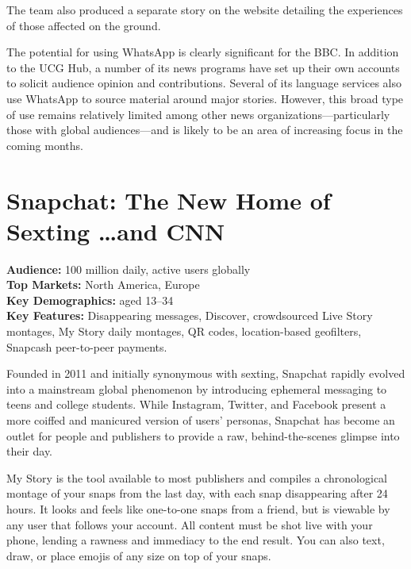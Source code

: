 \documentclass[notoc, symmetric, nobib, nols]{towcenter-guideto-book}
\begin{document}
The team also produced a separate story on the website detailing the experiences of those affected on the ground.\autocite{BBCNepal}


The potential for using WhatsApp is clearly significant for the BBC. In addition to the UCG Hub, a number of its news programs have set up their own accounts to solicit audience opinion and contributions. Several of its language services also use WhatsApp to source material around major stories. However, this broad type of use remains relatively limited among other news organizations---particularly those with global audiences---and is likely to be an area of increasing focus in the coming months.

\newpage
\section{Snapchat: The New Home of Sexting \ldots \protect\newline and CNN} 

\begin{framed}
\noindent\textbf{Audience:} 100 million daily, active users globally\\
\noindent\textbf{Top Markets:} North America, Europe\\
\noindent\textbf{Key Demographics:} aged 13--34\\
\noindent\textbf{Key Features:} Disappearing messages, Discover, crowdsourced Live Story montages, My Story daily montages, QR codes, location-based geofilters, Snapcash peer-to-peer payments.
\end{framed}
\vspace{\baselineskip}
Founded in 2011 and initially synonymous with sexting,\autocite{FCSnapchat} Snapchat rapidly evolved into a mainstream global phenomenon by introducing ephemeral messaging to teens and college students.  While Instagram, Twitter, and Facebook present a more coiffed and manicured version of users' personas, Snapchat has become an outlet for people and publishers to provide a raw, behind-the-scenes glimpse into their day.

My Story is the tool available to most publishers and compiles a chronological montage of your snaps from the last day, with each snap disappearing after 24 hours. It looks and feels like one-to-one snaps from a friend, but is viewable by any user that follows your account. All content must be shot live with your phone, lending a rawness and immediacy to the end result. You can also text, draw, or place emojis of any size on top of your snaps.
\end{document}
